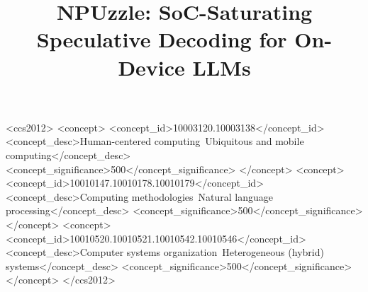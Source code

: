 \documentclass[sigconf,nonacm,10pt]{acmart}
\begin{document}
\title{NPUzzle: SoC-Saturating Speculative Decoding for On-Device LLMs}


\begin{abstract}

\end{abstract}

\begin{CCSXML}
<ccs2012>
   <concept>
       <concept_id>10003120.10003138</concept_id>
       <concept_desc>Human-centered computing~Ubiquitous and mobile computing</concept_desc>
       <concept_significance>500</concept_significance>
       </concept>
   <concept>
       <concept_id>10010147.10010178.10010179</concept_id>
       <concept_desc>Computing methodologies~Natural language processing</concept_desc>
       <concept_significance>500</concept_significance>
       </concept>
   <concept>
       <concept_id>10010520.10010521.10010542.10010546</concept_id>
       <concept_desc>Computer systems organization~Heterogeneous (hybrid) systems</concept_desc>
       <concept_significance>500</concept_significance>
       </concept>
 </ccs2012>
\end{CCSXML}

{\color{red}
}



\maketitle
\pagestyle{plain}
\end{document}
